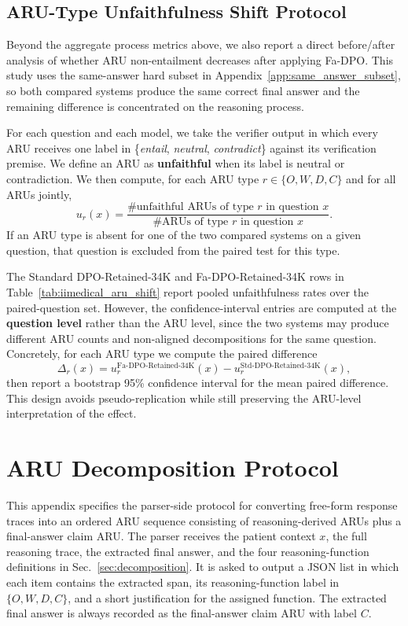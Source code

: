 \documentclass[a4paper,fleqn,doubleblind]{cas-sc}
\begin{document}
\subsection{ARU-Type Unfaithfulness Shift Protocol}
\label{app:aru_shift_protocol}

Beyond the aggregate process metrics above, we also report a direct before/after analysis of whether ARU non-entailment decreases after applying Fa-DPO. This study uses the same-answer hard subset in Appendix~\ref{app:same_answer_subset}, so both compared systems produce the same correct final answer and the remaining difference is concentrated on the reasoning process.

For each question and each model, we take the verifier output in which every ARU receives one label in \{\textit{entail}, \textit{neutral}, \textit{contradict}\} against its verification premise. We define an ARU as \textbf{unfaithful} when its label is neutral or contradiction. We then compute, for each ARU type $r \in \{O,W,D,C\}$ and for all ARUs jointly,
\[
u_r(x) = \frac{\# \text{unfaithful ARUs of type } r \text{ in question } x}{\# \text{ARUs of type } r \text{ in question } x}.
\]
If an ARU type is absent for one of the two compared systems on a given question, that question is excluded from the paired test for this type.

The Standard DPO-Retained-34K and Fa-DPO-Retained-34K rows in Table~\ref{tab:iimedical_aru_shift} report pooled unfaithfulness rates over the paired-question set. However, the confidence-interval entries are computed at the \textbf{question level} rather than the ARU level, since the two systems may produce different ARU counts and non-aligned decompositions for the same question. Concretely, for each ARU type we compute the paired difference
\[
\Delta_r(x) = u_r^{\text{Fa-DPO-Retained-34K}}(x) - u_r^{\text{Std-DPO-Retained-34K}}(x),
\]
then report a bootstrap 95\% confidence interval for the mean paired difference. This design avoids pseudo-replication while still preserving the ARU-level interpretation of the effect.

\section{ARU Decomposition Protocol}
\label{app:aru_protocol}

This appendix specifies the parser-side protocol for converting free-form response traces into an ordered ARU sequence consisting of reasoning-derived ARUs plus a final-answer claim ARU. The parser receives the patient context $x$, the full reasoning trace, the extracted final answer, and the four reasoning-function definitions in Sec.~\ref{sec:decomposition}. It is asked to output a JSON list in which each item contains the extracted span, its reasoning-function label in $\{O,W,D,C\}$, and a short justification for the assigned function. The extracted final answer is always recorded as the final-answer claim ARU with label $C$.
\end{document}
